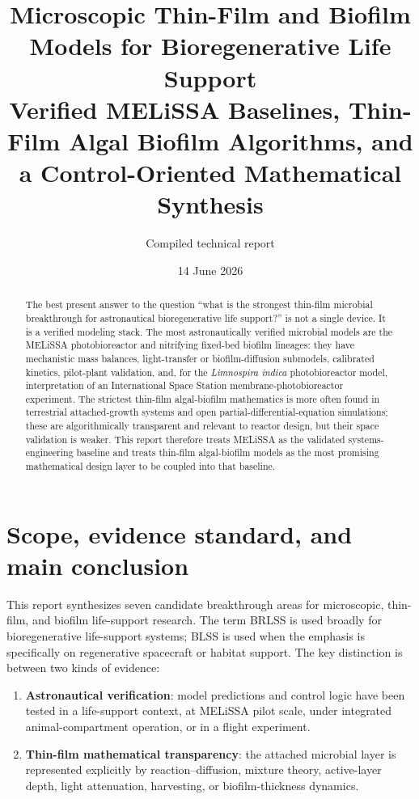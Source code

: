 \documentclass[11pt]{article}
\title{Microscopic Thin-Film and Biofilm Models for Bioregenerative Life Support\\
\large Verified MELiSSA Baselines, Thin-Film Algal Biofilm Algorithms, and a Control-Oriented Mathematical Synthesis}
\author{Compiled technical report}
\date{14 June 2026}
\newcommand{\MEL}{MELiSSA}
\newcommand{\BLSS}{BLSS}
\newcommand{\BRLSS}{BRLSS}
\newcommand{\Limno}{\textit{Limnospira indica}}
\begin{document}
\maketitle

\begin{abstract}
The best present answer to the question ``what is the strongest thin-film microbial breakthrough for astronautical bioregenerative life support?'' is not a single device. It is a verified modeling stack. The most astronautically verified microbial models are the \MEL{} photobioreactor and nitrifying fixed-bed biofilm lineages: they have mechanistic mass balances, light-transfer or biofilm-diffusion submodels, calibrated kinetics, pilot-plant validation, and, for the \Limno{} photobioreactor model, interpretation of an International Space Station membrane-photobioreactor experiment. The strictest thin-film algal-biofilm mathematics is more often found in terrestrial attached-growth systems and open partial-differential-equation simulations; these are algorithmically transparent and relevant to reactor design, but their space validation is weaker. This report therefore treats \MEL{} as the validated systems-engineering baseline and treats thin-film algal-biofilm models as the most promising mathematical design layer to be coupled into that baseline.
\end{abstract}

\tableofcontents
\newpage

\section{Scope, evidence standard, and main conclusion}

This report synthesizes seven candidate breakthrough areas for microscopic, thin-film, and biofilm life-support research. The term \BRLSS{} is used broadly for bioregenerative life-support systems; \BLSS{} is used when the emphasis is specifically on regenerative spacecraft or habitat support. The key distinction is between two kinds of evidence:

\begin{enumerate}
  \item \textbf{Astronautical verification}: model predictions and control logic have been tested in a life-support context, at \MEL{} pilot scale, under integrated animal-compartment operation, or in a flight experiment.
  \item \textbf{Thin-film mathematical transparency}: the attached microbial layer is represented explicitly by reaction--diffusion, mixture theory, active-layer depth, light attenuation, harvesting, or biofilm-thickness dynamics.
\end{enumerate}
\end{document}
